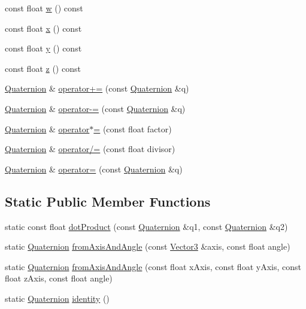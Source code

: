 \begin{DoxyCompactItemize}
\item 
const float \hyperlink{classprism_1_1_quaternion_aa930b57c8fbba2855722e82080a23cce}{w} () const 
\item 
const float \hyperlink{classprism_1_1_quaternion_ab3f80fc41a933a371b2861363997ce22}{x} () const 
\item 
const float \hyperlink{classprism_1_1_quaternion_a37023ce86684cb19287ec52cf27072f7}{y} () const 
\item 
const float \hyperlink{classprism_1_1_quaternion_a8af7b070028c48f61d1a76b1b49cbaac}{z} () const 
\item 
\hyperlink{classprism_1_1_quaternion}{Quaternion} \& \hyperlink{classprism_1_1_quaternion_a9e99b53a8017eea4d54fba9bb3ff0921}{operator+=} (const \hyperlink{classprism_1_1_quaternion}{Quaternion} \&q)
\item 
\hyperlink{classprism_1_1_quaternion}{Quaternion} \& \hyperlink{classprism_1_1_quaternion_a44b0ad93637f1b7b137850d2b00ce9ae}{operator-\/=} (const \hyperlink{classprism_1_1_quaternion}{Quaternion} \&q)
\item 
\hyperlink{classprism_1_1_quaternion}{Quaternion} \& \hyperlink{classprism_1_1_quaternion_a8e942d7794920c4ee7fcba9abd750c6c}{operator$\ast$=} (const float factor)
\item 
\hyperlink{classprism_1_1_quaternion}{Quaternion} \& \hyperlink{classprism_1_1_quaternion_ab850e8af1efa269eddf42e9171821b52}{operator/=} (const float divisor)
\item 
\hyperlink{classprism_1_1_quaternion}{Quaternion} \& \hyperlink{classprism_1_1_quaternion_a2b53c4088b26aaccc3cbed2496943d23}{operator=} (const \hyperlink{classprism_1_1_quaternion}{Quaternion} \&q)
\end{DoxyCompactItemize}
\subsection*{Static Public Member Functions}
\begin{DoxyCompactItemize}
\item 
static const float \hyperlink{classprism_1_1_quaternion_ad5c802136931b3316185c4bb939555e4}{dot\+Product} (const \hyperlink{classprism_1_1_quaternion}{Quaternion} \&q1, const \hyperlink{classprism_1_1_quaternion}{Quaternion} \&q2)
\item 
static \hyperlink{classprism_1_1_quaternion}{Quaternion} \hyperlink{classprism_1_1_quaternion_aa37e7cababfe0374be478d27a8a8298a}{from\+Axis\+And\+Angle} (const \hyperlink{classprism_1_1_vector3}{Vector3} \&axis, const float angle)
\item 
static \hyperlink{classprism_1_1_quaternion}{Quaternion} \hyperlink{classprism_1_1_quaternion_a35bf3b5687fd42a31c5d33a4b4b65bc0}{from\+Axis\+And\+Angle} (const float x\+Axis, const float y\+Axis, const float z\+Axis, const float angle)
\item 
static \hyperlink{classprism_1_1_quaternion}{Quaternion} \hyperlink{classprism_1_1_quaternion_ab662033392acd76f265f295ba9ddd7db}{identity} ()
\end{DoxyCompactItemize}
